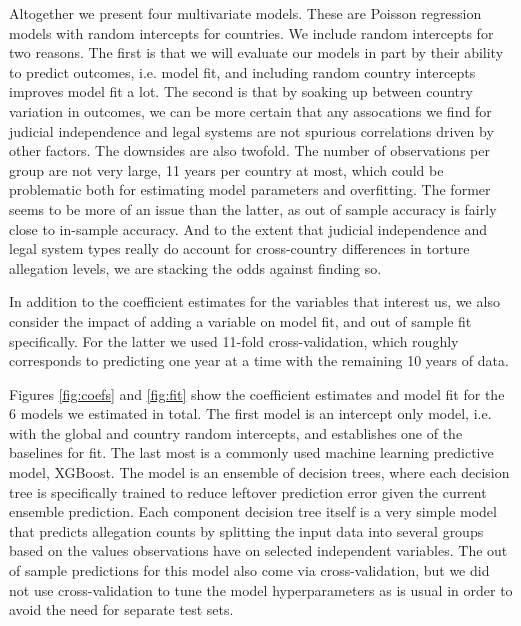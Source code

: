 \documentclass[12pt]{article}
\begin{document}
Altogether we present four multivariate models. These are Poisson regression models with random intercepts for countries. We include random intercepts for two reasons. The first is that we will evaluate our models in part by their ability to predict outcomes, i.e. model fit, and including random country intercepts improves model fit a lot. The second is that by soaking up between country variation in outcomes, we can be more certain that any assocations we find for judicial independence and legal systems are not spurious correlations driven by other factors. The downsides are also twofold. The number of observations per group are not very large, 11 years per country at most, which could be problematic both for estimating model parameters and overfitting. The former seems to be more of an issue than the latter, as out of sample accuracy is fairly close to in-sample accuracy. And to the extent that judicial independence and legal system types really do account for cross-country differences in torture allegation levels, we are stacking the odds against finding so. 

In addition to the coefficient estimates for the variables that interest us, we also consider the impact of adding a variable on model fit, and out of sample fit specifically. For the latter we used 11-fold cross-validation, which roughly corresponds to predicting one year at a time with the remaining 10 years of data. 

Figures \ref{fig:coefs} and \ref{fig:fit} show the coefficient estimates and model fit for the 6 models we estimated in total. The first model is an intercept only model, i.e. with the global and country random intercepts, and establishes one of the baselines for fit. The last most is a commonly used machine learning predictive model, XGBoost. The model is an ensemble of decision trees, where each decision tree is specifically trained to reduce leftover prediction error given the current ensemble prediction. Each component decision tree itself is a very simple model that predicts allegation counts by splitting the input data into several groups based on the values observations have on selected independent variables. The out of sample predictions for this model also come via cross-validation, but we did not use cross-validation to tune the model hyperparameters as is usual in order to avoid the need for separate test sets.  
\end{document}
